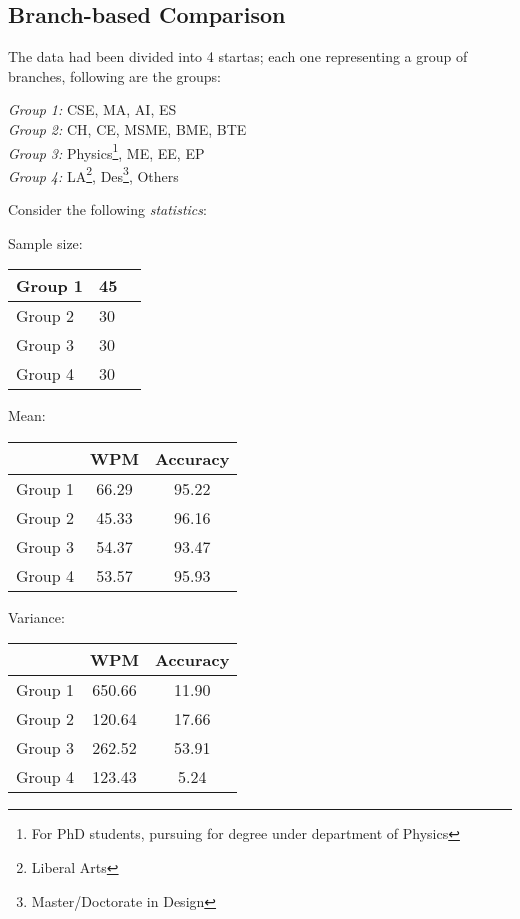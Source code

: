 \documentclass[12pt,a4paper]{report}
\begin{document}
\subsection*{Branch-based Comparison}
The data had been divided into 4 startas; each one representing a group of branches, following are the groups:
\begin{center}
    \hspace{-8mm}\emph{Group 1:} CSE, MA, AI, ES \\
    \hspace{14mm}\emph{Group 2:} CH, CE, MSME, BME, BTE \\
    \emph{Group 3:} Physics\footnote{For PhD students, pursuing for degree under department of Physics}, ME, EE, EP \\
    \hspace{-7mm}\emph{Group 4:} LA\footnote{Liberal Arts}, Des\footnote{Master/Doctorate in Design}, Others \\
\end{center}
Consider the following \emph{statistics}:

\begin{center}
Sample size:
\begin{tabular}{ | m{4em} | m{1cm}| m{1cm} | }
    \hline
    Group 1 & 45 \\ 
    \hline
    Group 2 & 30 \\
    \hline
    Group 3 & 30 \\
    \hline
    Group 4 & 30 \\
    \hline
\end{tabular}
\end{center}
\vspace{1.5mm}

\begin{center}
Mean:
\begin{tabular}{ |c|c|c|}
  \hline
   & WPM & Accuracy \\
  \hline
  Group 1 & 66.29 & 95.22 \\ 
  \hline
  Group 2 & 45.33 & 96.16 \\
  \hline
  Group 3 & 54.37 & 93.47 \\
  \hline
  Group 4 & 53.57 & 95.93 \\
  \hline
\end{tabular}
\end{center}
\vspace{1.5mm}

\begin{center}
Variance:
\begin{tabular}{ |c|c|c|}
  \hline
   & WPM & Accuracy \\
  \hline
  Group 1 & 650.66 & 11.90 \\ 
  \hline
  Group 2 & 120.64 & 17.66 \\
  \hline
  Group 3 & 262.52 & 53.91 \\
  \hline
  Group 4 & 123.43 & 5.24 \\
  \hline
\end{tabular}
\end{center}
\end{document}
